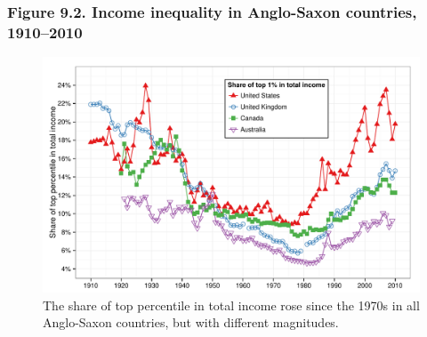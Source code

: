 \documentclass[t]{beamer}\usepackage[]{graphicx}\usepackage[]{color}
\newenvironment{knitrout}{}{} %
\begin{document}
\begin{frame}[label=Figure_9_2]
\frametitle{Figure 9.2. Income inequality in Anglo-Saxon countries, 1910--2010}
\begin{figure}[t]
\begin{minipage}[b]{\textwidth}
\centering
\begin{knitrout}\footnotesize
{}\color{fgcolor}

{\centering \includegraphics[width=1\linewidth]{figures/color/Figure_9_2} 

}



\end{knitrout}
\caption{The share of top percentile in total income rose since the 1970s in all Anglo-Saxon countries, but with different magnitudes.}
\end{minipage}
\end{figure}
\end{frame}
\end{document}
